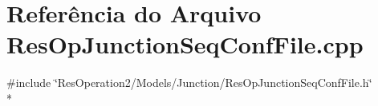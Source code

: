 \section{Referência do Arquivo Res\+Op\+Junction\+Seq\+Conf\+File.\+cpp}
\label{_res_op_junction_seq_conf_file_8cpp}
{\ttfamily \#include \char`\"{}Res\+Operation2/\+Models/\+Junction/\+Res\+Op\+Junction\+Seq\+Conf\+File.\+h\char`\"{}}\\*
